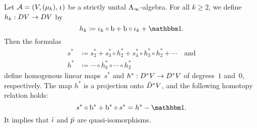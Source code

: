 \documentclass[\MainFolder/Text.tex]{subfiles}
\begin{document}
\begin{Lemma}[CP4] \label{Lem:CP4}
Let $\mathcal{A} = (V,(\mu_k),\NOne)$ be a strictly unital $\mathrm{A}_\infty$-algebra. For all $k\ge 2$, we define $h_k: D V \rightarrow D V$ by
$$ h_k\coloneqq \InsOneOp_k \circ \Hd + \Hd\circ \InsOneOp_k + \Id. $$
Then the formulas
\begin{align*}
    s^* &\coloneqq  s^*_2 + s^*_3 \circ h^*_2 + s^*_4 \circ h^*_3 \circ h_2^* + \dotsb\quad\text{and} \\
    h^* &\coloneqq \dotsb\circ h^*_k\circ\dotsb\circ h^*_2
\end{align*}
define homogenous linear maps~$s^*$ and $h^*: D^*V \rightarrow D^* V$ of degrees~$1$ and~$0$, respectively. The map $h^*$ is a projection onto $\bar{D}^* V$, and the following homotopy relation holds:
\begin{equation} \label{Eq:Homot}
s^* \circ \Hd^* + \Hd^* \circ s^* = h^* - \Id.
\end{equation}
It implies that $\bar{\iota}$ and $\bar{p}$ are quasi-isomorphisms.
\end{Lemma}
\end{document}
